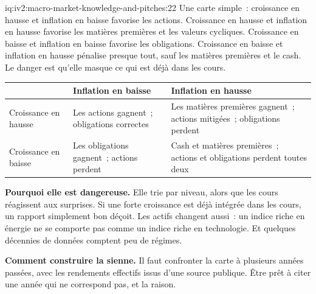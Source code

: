 \begin{solution}{iq:iv2:macro-market-knowledge-and-pitches:22}
Une carte simple~: croissance en hausse et inflation en baisse favorise les actions. Croissance en hausse et inflation en hausse favorise les matières premières et les valeurs cycliques. Croissance en baisse et inflation en baisse favorise les obligations. Croissance en baisse et inflation en hausse pénalise presque tout, sauf les matières premières et le cash. Le danger est qu'elle masque ce qui est déjà dans les cours.

\begin{center}
\begin{tabular}{@{}>{\raggedright\arraybackslash}p{2.6cm}>{\raggedright\arraybackslash}p{6.3cm}>{\raggedright\arraybackslash}p{6.3cm}@{}}
\toprule
 & Inflation en baisse & Inflation en hausse \\
\midrule
Croissance en hausse & Les actions gagnent~; obligations correctes & Les matières premières gagnent~; actions mitigées~; obligations perdent \\
Croissance en baisse & Les obligations gagnent~; actions perdent & Cash et matières premières~; actions et obligations perdent toutes deux \\
\bottomrule
\end{tabular}
\end{center}

\textbf{Pourquoi elle est dangereuse.} Elle trie par niveau, alors que les cours réagissent aux surprises. Si une forte croissance est déjà intégrée dans les cours, un rapport simplement bon déçoit. Les actifs changent aussi~: un indice riche en énergie ne se comporte pas comme un indice riche en technologie. Et quelques décennies de données comptent peu de régimes.

\textbf{Comment construire la sienne.} Il faut confronter la carte à plusieurs années passées, avec les rendements effectifs issus d'une source publique. Être prêt à citer une année qui ne correspond pas, et la raison.

\end{solution}

